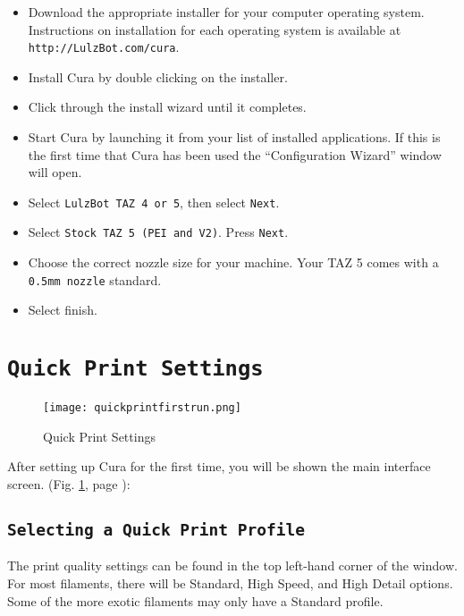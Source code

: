 \begin{itemize}
\item Download the appropriate installer for your computer operating system. Instructions on installation for each operating system is available at \texttt{http://LulzBot.com/cura}.
\item Install Cura by double clicking on the installer.
\item Click through the install wizard until it completes.
\item Start Cura by launching it from your list of installed applications. If this is the first time that Cura has been used the ``Configuration Wizard'' window will open.
\item Select \texttt{LulzBot\textsuperscript{\miniscule{\texttrademark}} TAZ 4 or 5}, then select \texttt{Next}.
\item Select \texttt{Stock TAZ 5 (PEI and V2)}. Press \texttt{Next}.
\item Choose the correct nozzle size for your machine. Your TAZ 5 comes with a \texttt{0.5mm nozzle} standard.
\item Select finish.
\end{itemize}




\section{\texttt{Quick Print Settings}}
\begin{figure}[H]
\centering
\texttt{[image: quickprintfirstrun.png]}
\caption{Quick Print Settings}
\label{fig:Cura}
\end{figure} 
After setting up Cura for the first time, you will be shown the main interface screen. (Fig. \ref{fig:Cura}, page \pageref{fig:Cura}): 

\subsection{\texttt{Selecting a Quick Print Profile}}
The print quality settings can be found in the top left-hand corner of the window. For most filaments, there will be Standard, High Speed, and High Detail options. Some of the more exotic filaments may only have a Standard profile.

